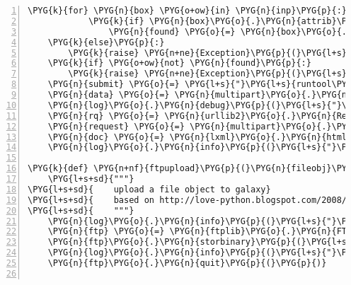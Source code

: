 \begin{Verbatim}[commandchars=\\\{\},numbers=left,firstnumber=1,stepnumber=5]
        \PYG{k}{for} \PYG{n}{box} \PYG{o+ow}{in} \PYG{n}{inp}\PYG{p}{:}
            \PYG{k}{if} \PYG{n}{box}\PYG{o}{.}\PYG{n}{attrib}\PYG{p}{[}\PYG{l+s}{'}\PYG{l+s}{value}\PYG{l+s}{'}\PYG{p}{]} \PYG{o}{==} \PYG{n}{filename}\PYG{p}{:}
                \PYG{n}{found} \PYG{o}{=} \PYG{n}{box}\PYG{o}{.}\PYG{n}{checked} \PYG{o}{=} \PYG{n+nb+bp}{True}
    \PYG{k}{else}\PYG{p}{:}
        \PYG{k}{raise} \PYG{n+ne}{Exception}\PYG{p}{(}\PYG{l+s}{"}\PYG{l+s}{unexpected html element: }\PYG{l+s+si}{\PYGZpc{}s}\PYG{l+s}{"} \PYG{o}{\PYGZpc{}} \PYG{n}{inp}\PYG{p}{)}
    \PYG{k}{if} \PYG{o+ow}{not} \PYG{n}{found}\PYG{p}{:}
        \PYG{k}{raise} \PYG{n+ne}{Exception}\PYG{p}{(}\PYG{l+s}{"}\PYG{l+s}{file not available for import: }\PYG{l+s+si}{\PYGZpc{}s}\PYG{l+s}{"} \PYG{o}{\PYGZpc{}} \PYG{n}{filename}\PYG{p}{)}
    \PYG{n}{submit} \PYG{o}{=} \PYG{l+s}{"}\PYG{l+s}{runtool\PYGZus{}btn}\PYG{l+s}{"}\PYG{p}{,} \PYG{n}{form}\PYG{o}{.}\PYG{n}{fields}\PYG{p}{[}\PYG{l+s}{"}\PYG{l+s}{runtool\PYGZus{}btn}\PYG{l+s}{"}\PYG{p}{]}
    \PYG{n}{data} \PYG{o}{=} \PYG{n}{multipart}\PYG{o}{.}\PYG{n}{urlencode}\PYG{p}{(}\PYG{n}{form}\PYG{o}{.}\PYG{n}{form\PYGZus{}values}\PYG{p}{(}\PYG{p}{)} \PYG{o}{+} \PYG{p}{[}\PYG{n}{submit}\PYG{p}{]}\PYG{p}{)}
    \PYG{n}{log}\PYG{o}{.}\PYG{n}{debug}\PYG{p}{(}\PYG{l+s}{"}\PYG{l+s}{posting upload form: }\PYG{l+s+si}{\PYGZpc{}s}\PYG{l+s}{"} \PYG{o}{\PYGZpc{}} \PYG{n}{form}\PYG{o}{.}\PYG{n}{action}\PYG{p}{)}
    \PYG{n}{rq} \PYG{o}{=} \PYG{n}{urllib2}\PYG{o}{.}\PYG{n}{Request}\PYG{p}{(}\PYG{n}{form}\PYG{o}{.}\PYG{n}{action}\PYG{p}{,} \PYG{n}{data}\PYG{p}{,} \PYG{n}{headers}\PYG{o}{=}\PYG{n}{rq\PYGZus{}headers}\PYG{p}{)}
    \PYG{n}{request} \PYG{o}{=} \PYG{n}{multipart}\PYG{o}{.}\PYG{n}{urlopen}\PYG{p}{(}\PYG{n}{rq}\PYG{p}{)}
    \PYG{n}{doc} \PYG{o}{=} \PYG{n}{lxml}\PYG{o}{.}\PYG{n}{html}\PYG{o}{.}\PYG{n}{parse}\PYG{p}{(}\PYG{n}{request}\PYG{p}{)}\PYG{o}{.}\PYG{n}{getroot}\PYG{p}{(}\PYG{p}{)}
    \PYG{n}{log}\PYG{o}{.}\PYG{n}{info}\PYG{p}{(}\PYG{l+s}{"}\PYG{l+s}{Success!}\PYG{l+s}{"}\PYG{p}{)}

\PYG{k}{def} \PYG{n+nf}{ftpupload}\PYG{p}{(}\PYG{n}{fileobj}\PYG{p}{,} \PYG{n}{filename}\PYG{p}{)}\PYG{p}{:}
    \PYG{l+s+sd}{"""}
\PYG{l+s+sd}{    upload a file object to galaxy}
\PYG{l+s+sd}{    based on http://love-python.blogspot.com/2008/02/ftp-file-upload.html}
\PYG{l+s+sd}{    """}
    \PYG{n}{log}\PYG{o}{.}\PYG{n}{info}\PYG{p}{(}\PYG{l+s}{"}\PYG{l+s}{uploading file to ftp server}\PYG{l+s}{"}\PYG{p}{)}
    \PYG{n}{ftp} \PYG{o}{=} \PYG{n}{ftplib}\PYG{o}{.}\PYG{n}{FTP}\PYG{p}{(}\PYG{n}{hostname}\PYG{p}{,} \PYG{n}{email}\PYG{p}{,} \PYG{n}{password}\PYG{p}{)}
    \PYG{n}{ftp}\PYG{o}{.}\PYG{n}{storbinary}\PYG{p}{(}\PYG{l+s}{'}\PYG{l+s}{STOR }\PYG{l+s}{'} \PYG{o}{+} \PYG{n}{filename}\PYG{p}{,} \PYG{n}{fileobj}\PYG{p}{)}
    \PYG{n}{log}\PYG{o}{.}\PYG{n}{info}\PYG{p}{(}\PYG{l+s}{"}\PYG{l+s}{Success!}\PYG{l+s}{"}\PYG{p}{)}
    \PYG{n}{ftp}\PYG{o}{.}\PYG{n}{quit}\PYG{p}{(}\PYG{p}{)}


\end{Verbatim}
